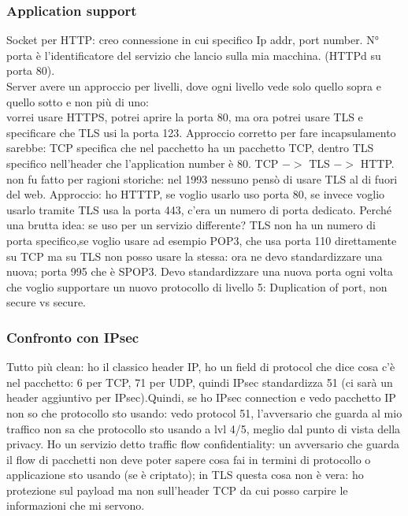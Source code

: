 \documentclass[16px]{article}
\begin{document}
\subsubsection{Application support}
Socket per HTTP: creo connessione in cui specifico Ip addr, port number. N° porta è l'identificatore del servizio che lancio sulla mia macchina. (HTTPd su porta 80).\\ Server avere un approccio per livelli, dove ogni livello vede solo quello sopra e quello sotto e non più di uno: \\ vorrei usare HTTPS, potrei aprire la porta 80, ma ora potrei usare TLS e specificare che TLS usi la porta 123. Approccio corretto per fare incapsulamento sarebbe: TCP specifica che nel pacchetto ha un pacchetto TCP, dentro TLS specifico nell'header che l'application number è 80. TCP $->$ TLS $->$ HTTP. non fu fatto per ragioni storiche: nel 1993 nessuno pensò di usare TLS al di fuori del web. Approccio: ho HTTTP, se voglio usarlo uso porta 80, se invece voglio usarlo tramite TLS usa la porta 443, c'era un numero di porta dedicato. Perché una brutta idea: se uso per un servizio differente? TLS non ha un numero di porta specifico,se voglio usare ad esempio POP3, che usa porta 110 direttamente su TCP ma su TLS non posso usare la stessa: ora ne devo standardizzare una nuova; porta 995 che è SPOP3. Devo standardizzare una nuova porta ogni volta che voglio supportare un nuovo protocollo di livello 5: Duplication of port, non secure vs secure.
\subsubsection{Confronto con IPsec}
Tutto più clean: ho il classico header IP, ho un field di protocol che dice cosa c'è nel pacchetto: 6 per TCP, 71 per UDP, quindi IPsec standardizza 51 (ci sarà un header aggiuntivo per IPsec).Quindi, se ho IPsec connection e vedo pacchetto IP non so che protocollo sto usando: vedo protocol 51, l'avversario che guarda al mio traffico non sa che protocollo sto usando a lvl 4/5, meglio dal punto di vista della privacy. Ho un servizio detto traffic flow confidentiality: un avversario che guarda il flow di pacchetti non deve poter sapere cosa fai in termini di protocollo o applicazione sto usando (se è criptato); in TLS questa cosa non è vera: ho protezione sul payload ma non sull'header TCP da cui posso carpire le informazioni che mi servono.
\end{document}
